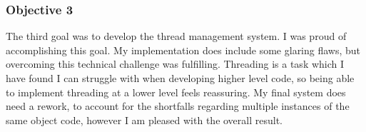 \subsubsection{Objective 3}
The third goal was to develop the thread management system. I was proud of accomplishing this goal. My implementation does include some glaring flaws, but overcoming this technical challenge was fulfilling. Threading is a task which I have found I can struggle with when developing higher level code, so being able to implement threading at a lower level feels reassuring. My final system does need a rework, to account for the shortfalls regarding multiple instances of the same object code, however I am pleased with the overall result. 






